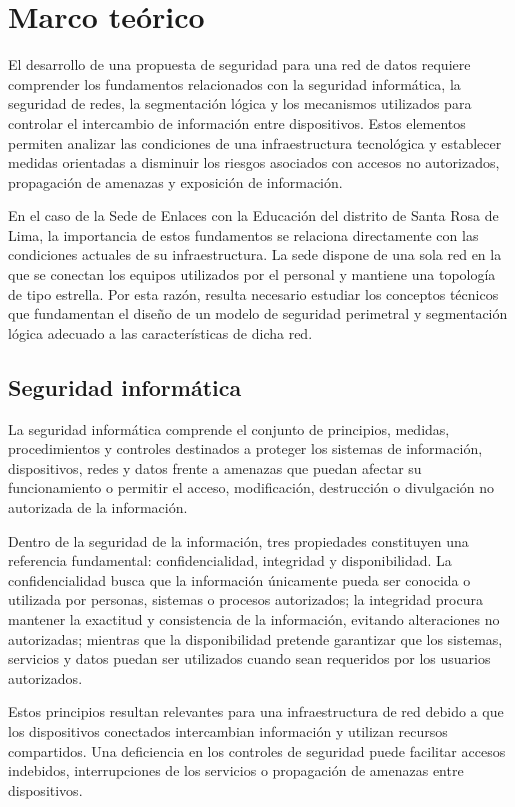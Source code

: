 \section{Marco teórico}

El desarrollo de una propuesta de seguridad para una red de datos requiere comprender los fundamentos relacionados con la seguridad informática, la seguridad de redes, la segmentación lógica y los mecanismos utilizados para controlar el intercambio de información entre dispositivos. Estos elementos permiten analizar las condiciones de una infraestructura tecnológica y establecer medidas orientadas a disminuir los riesgos asociados con accesos no autorizados, propagación de amenazas y exposición de información.

En el caso de la Sede de Enlaces con la Educación del distrito de Santa Rosa de Lima, la importancia de estos fundamentos se relaciona directamente con las condiciones actuales de su infraestructura. La sede dispone de una sola red en la que se conectan los equipos utilizados por el personal y mantiene una topología de tipo estrella. Por esta razón, resulta necesario estudiar los conceptos técnicos que fundamentan el diseño de un modelo de seguridad perimetral y segmentación lógica adecuado a las características de dicha red.

\subsection{Seguridad informática}

La seguridad informática comprende el conjunto de principios, medidas, procedimientos y controles destinados a proteger los sistemas de información, dispositivos, redes y datos frente a amenazas que puedan afectar su funcionamiento o permitir el acceso, modificación, destrucción o divulgación no autorizada de la información.

Dentro de la seguridad de la información, tres propiedades constituyen una referencia fundamental: confidencialidad, integridad y disponibilidad. La confidencialidad busca que la información únicamente pueda ser conocida o utilizada por personas, sistemas o procesos autorizados; la integridad procura mantener la exactitud y consistencia de la información, evitando alteraciones no autorizadas; mientras que la disponibilidad pretende garantizar que los sistemas, servicios y datos puedan ser utilizados cuando sean requeridos por los usuarios autorizados.

Estos principios resultan relevantes para una infraestructura de red debido a que los dispositivos conectados intercambian información y utilizan recursos compartidos. Una deficiencia en los controles de seguridad puede facilitar accesos indebidos, interrupciones de los servicios o propagación de amenazas entre dispositivos.

